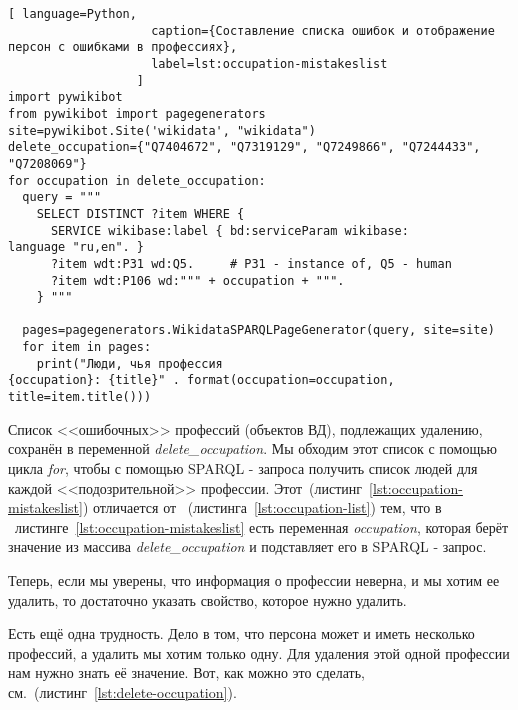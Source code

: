 \begin{lstlisting}[ language=Python,
                    caption={Составление списка ошибок и отображение персон с ошибками в профессиях},
                    label=lst:occupation-mistakeslist
                  ]
import pywikibot
from pywikibot import pagegenerators
site=pywikibot.Site('wikidata', "wikidata")
delete_occupation={"Q7404672", "Q7319129", "Q7249866", "Q7244433", 
"Q7208069"}
for occupation in delete_occupation:
  query = """
    SELECT DISTINCT ?item WHERE {
      SERVICE wikibase:label { bd:serviceParam wikibase:
language "ru,en". }
      ?item wdt:P31 wd:Q5.     # P31 - instance of, Q5 - human
      ?item wdt:P106 wd:""" + occupation + """.
    } """

  pages=pagegenerators.WikidataSPARQLPageGenerator(query, site=site)
  for item in pages:
    print("Люди, чья профессия 
{occupation}: {title}" . format(occupation=occupation, 
title=item.title()))
\end{lstlisting} 

Список <<ошибочных>> профессий (объектов ВД), подлежащих удалению, сохранён в переменной \textit{delete\_occupation}. Мы обходим этот список с помощью цикла \textit{for}, чтобы с помощью SPARQL - запроса получить список людей для каждой <<подозрительной>> профессии. Этот~(листинг~\ref{lst:occupation-mistakeslist}) отличается от ~(листинга~\ref{lst:occupation-list}) тем, что в ~листинге~\ref{lst:occupation-mistakeslist} есть переменная \textit{occupation}, которая берёт значение из массива \textit{delete\_occupation} и подставляет его в SPARQL - запрос.

Теперь, если мы уверены, что информация о профессии неверна, и мы хотим ее удалить, то достаточно указать свойство, которое нужно удалить.

Есть ещё одна трудность. Дело в том, что персона может и иметь несколько профессий, а удалить мы хотим только одну. Для удаления этой одной профессии нам нужно знать её значение. Вот, как можно это сделать, см.~(листинг~\ref{lst:delete-occupation}). 

